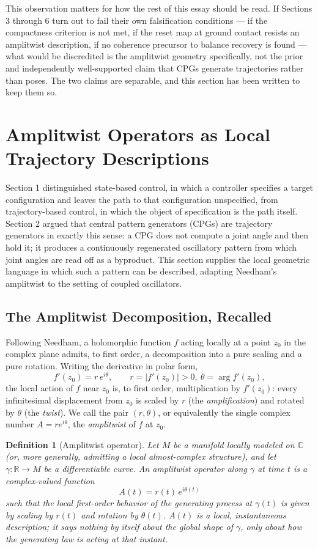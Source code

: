 \documentclass[12pt]{article}
\newtheorem{definition}{Definition}
\begin{document}
This observation matters for how the rest of this essay should be read. If Sections 3 through 6 turn out to fail their own falsification conditions — if the compactness criterion is not met, if the reset map at ground contact resists an amplitwist description, if no coherence precursor to balance recovery is found — what would be discredited is the amplitwist geometry specifically, not the prior and independently well-supported claim that CPGs generate trajectories rather than poses. The two claims are separable, and this section has been written to keep them so.

\section{Amplitwist Operators as Local Trajectory Descriptions}

Section 1 distinguished state-based control, in which a controller specifies a target configuration and leaves the path to that configuration unspecified, from trajectory-based control, in which the object of specification is the path itself. Section 2 argued that central pattern generators (CPGs) are trajectory generators in exactly this sense: a CPG does not compute a joint angle and then hold it; it produces a continuously regenerated oscillatory pattern from which joint angles are read off as a byproduct. This section supplies the local geometric language in which such a pattern can be described, adapting Needham's amplitwist to the setting of coupled oscillators.

\subsection{The Amplitwist Decomposition, Recalled}

Following Needham, a holomorphic function $f$ acting locally at a point $z_0$ in the complex plane admits, to first order, a decomposition into a pure scaling and a pure rotation. Writing the derivative in polar form,
\[
f'(z_0) = r\, e^{i\theta}, \qquad r = |f'(z_0)| > 0,\ \theta = \arg f'(z_0),
\]
the local action of $f$ near $z_0$ is, to first order, multiplication by $f'(z_0)$: every infinitesimal displacement from $z_0$ is scaled by $r$ (the \emph{amplification}) and rotated by $\theta$ (the \emph{twist}). We call the pair $(r,\theta)$, or equivalently the single complex number $A = r e^{i\theta}$, the \emph{amplitwist} of $f$ at $z_0$.

\begin{definition}[Amplitwist operator]
Let $M$ be a manifold locally modeled on $\mathbb{C}$ (or, more generally, admitting a local almost-complex structure), and let $\gamma: \mathbb{R} \to M$ be a differentiable curve. An \emph{amplitwist operator} along $\gamma$ at time $t$ is a complex-valued function
\[
A(t) = r(t)\, e^{i\theta(t)}
\]
such that the local first-order behavior of the generating process at $\gamma(t)$ is given by scaling by $r(t)$ and rotation by $\theta(t)$. $A(t)$ is a local, instantaneous description; it says nothing by itself about the global shape of $\gamma$, only about how the generating law is acting at that instant.
\end{definition}
\end{document}
